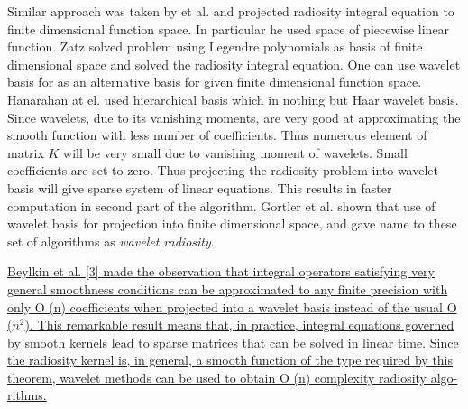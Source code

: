 Similar approach was taken by et al. \cite{heckbert} and projected radiosity integral equation to finite dimensional function space. In particular he used space of piecewise linear function. Zatz \cite{zatz} solved problem using Legendre polynomials as basis of finite dimensional space and solved the radiosity integral equation. One can use wavelet basis for as an alternative basis for given finite dimensional function space. Hanarahan at el. \cite{hanarahan} used hierarchical basis which in nothing but Haar wavelet basis. Since wavelets, due to its vanishing moments, are very good at approximating the smooth function with less number of coefficients. Thus numerous element of matrix $K$ will be very small due to vanishing moment of wavelets. Small coefficients are set to zero. Thus projecting the radiosity problem into wavelet basis will give sparse system of linear equations. This results in faster computation in second part of the algorithm. Gortler et al. \cite{gortler} shown that use of wavelet basis for projection into finite dimensional space, and gave name to these set of algorithms as {\em wavelet radiosity}.


\underline{Beylkin et al. [3] made the observation that integral operators satisfying very general smoothness conditions can be approximated to any finite precision with only O (n) coefficients
when projected into a wavelet basis instead of the usual O ($n^2$).
This remarkable result means that, in practice, integral equations
governed by smooth kernels lead to sparse matrices that can be
solved in linear time. Since the radiosity kernel is, in general,
a smooth function of the type required by this theorem, wavelet
methods can be used to obtain O (n) complexity radiosity algo-
rithms.}


